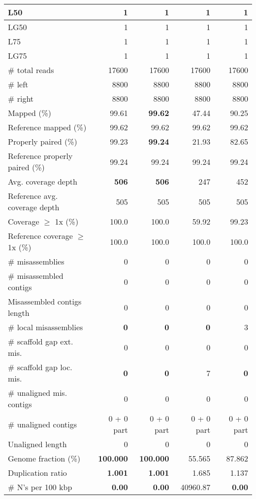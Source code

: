 \documentclass[12pt,a4paper]{article}
\begin{document}
\begin{table}[ht]
\begin{center}
\begin{tabular}{|l*{4}{|r}|}
L50 & 1 & 1 & 1 & 1 \\ \hline
LG50 & 1 & 1 & 1 & 1 \\ \hline
L75 & 1 & 1 & 1 & 1 \\ \hline
LG75 & 1 & 1 & 1 & 1 \\ \hline
\# total reads & 17600 & 17600 & 17600 & 17600 \\ \hline
\# left & 8800 & 8800 & 8800 & 8800 \\ \hline
\# right & 8800 & 8800 & 8800 & 8800 \\ \hline
Mapped (\%) & 99.61 & {\bf 99.62} & 47.44 & 90.25 \\ \hline
Reference mapped (\%) & 99.62 & 99.62 & 99.62 & 99.62 \\ \hline
Properly paired (\%) & 99.23 & {\bf 99.24} & 21.93 & 82.65 \\ \hline
Reference properly paired (\%) & 99.24 & 99.24 & 99.24 & 99.24 \\ \hline
Avg. coverage depth & {\bf 506} & {\bf 506} & 247 & 452 \\ \hline
Reference avg. coverage depth & 505 & 505 & 505 & 505 \\ \hline
Coverage $\geq$ 1x (\%) & 100.0 & 100.0 & 59.92 & 99.23 \\ \hline
Reference coverage $\geq$ 1x (\%) & 100.0 & 100.0 & 100.0 & 100.0 \\ \hline
\# misassemblies & 0 & 0 & 0 & 0 \\ \hline
\# misassembled contigs & 0 & 0 & 0 & 0 \\ \hline
Misassembled contigs length & 0 & 0 & 0 & 0 \\ \hline
\# local misassemblies & {\bf 0} & {\bf 0} & {\bf 0} & 3 \\ \hline
\# scaffold gap ext. mis. & 0 & 0 & 0 & 0 \\ \hline
\# scaffold gap loc. mis. & {\bf 0} & {\bf 0} & 7 & {\bf 0} \\ \hline
\# unaligned mis. contigs & 0 & 0 & 0 & 0 \\ \hline
\# unaligned contigs & 0 + 0 part & 0 + 0 part & 0 + 0 part & 0 + 0 part \\ \hline
Unaligned length & 0 & 0 & 0 & 0 \\ \hline
Genome fraction (\%) & {\bf 100.000} & {\bf 100.000} & 55.565 & 87.862 \\ \hline
Duplication ratio & {\bf 1.001} & {\bf 1.001} & 1.685 & 1.137 \\ \hline
\# N's per 100 kbp & {\bf 0.00} & {\bf 0.00} & 40960.87 & {\bf 0.00} \\ \hline

\end{tabular}
\end{center}
\end{table}
\end{document}
